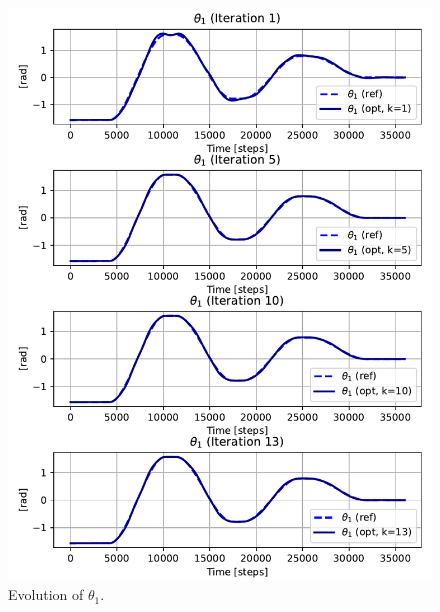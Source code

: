 \begin{figure}[htb]
    \includegraphics[width=1\linewidth]{img/2-task2/th1_evolution.pdf}
    \caption{Evolution of $\theta_1$.}
    \label{fig:theta1-evolution}
\end{figure}

